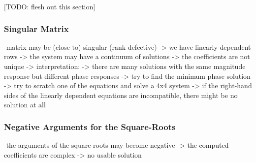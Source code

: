 [TODO: flesh out this section]

\subsubsection{Singular Matrix}

-matrix may be (close to) singular (rank-defective) 
 -> we have linearly dependent rows 
 -> the system may have a continuum of solutions
    -> the coefficients are not unique 
       -> interpretation: 
          -> there are many solutions with the same magnitude response but different phase responses
          -> try to find the minimum phase solution
    -> try to scratch one of the equations and solve a 4x4 system
 -> if the right-hand sides of the linearly dependent equations are incompatible, there might be no solution at all
 
\subsubsection{Negative Arguments for the Square-Roots} 
 
-the arguments of the square-roots may become negative
 -> the computed coefficients are complex
 -> no usable solution

 

